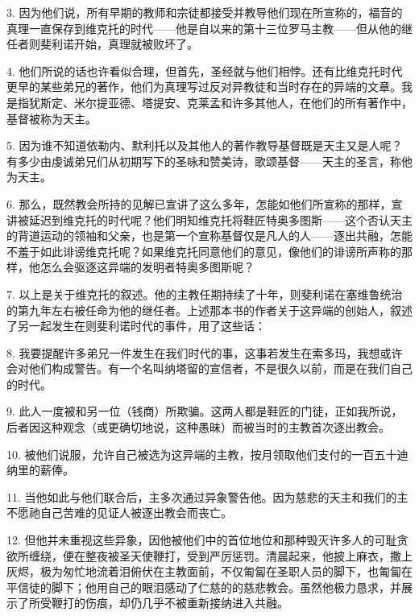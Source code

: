 3. 因为他们说，所有早期的教师和宗徒都接受并教导他们现在所宣称的，福音的真理一直保存到维克托的时代——他是自以来的第十三位罗马主教——但从他的继任者则斐利诺开始，真理就被败坏了。\par

4. 他们所说的话也许看似合理，但首先，圣经就与他们相悖。还有比维克托时代更早的某些弟兄的著作，他们为真理写过反对异教徒和当时存在的异端的文章。我是指犹斯定、米尔提亚德、塔提安、克莱孟和许多其他人，在他们的所有著作中，基督被称为天主。\par

5. 因为谁不知道依勒内、默利托以及其他人的著作教导基督既是天主又是人呢？有多少由虔诚弟兄们从初期写下的圣咏和赞美诗，歌颂基督——天主的圣言，称他为天主。\par

6. 那么，既然教会所持的见解已宣讲了这么多年，怎能如他们所宣称的那样，宣讲被延迟到维克托的时代呢？他们明知维克托将鞋匠特奥多图斯——这个否认天主的背道运动的领袖和父亲，也是第一个宣称基督仅是凡人的人——逐出共融，怎能不羞于如此诽谤维克托呢？如果维克托同意他们的意见，像他们的诽谤所声称的那样，他怎么会驱逐这异端的发明者特奥多图斯呢？\par

7. 以上是关于维克托的叙述。他的主教任期持续了十年，则斐利诺在塞维鲁统治的第九年左右被任命为他的继任者。上述那本书的作者关于这异端的创始人，叙述了另一起发生在则斐利诺时代的事件，用了这些话：\par

8. 我要提醒许多弟兄一件发生在我们时代的事，这事若发生在索多玛，我想或许会对他们构成警告。有一个名叫纳塔留的宣信者，不是很久以前，而是在我们自己的时代。\par

9. 此人一度被和另一位（钱商）所欺骗。这两人都是鞋匠的门徒，正如我所说，后者因这种观念（或更确切地说，这种愚昧）而被当时的主教首次逐出教会。\par

10. 被他们说服，允许自己被选为这异端的主教，按月领取他们支付的一百五十迪纳里的薪俸。\par

11. 当他如此与他们联合后，主多次通过异象警告他。因为慈悲的天主和我们的主不愿祂自己苦难的见证人被逐出教会而丧亡。\par

12. 但他并未重视这些异象，因他被他们中的首位地位和那种毁灭许多人的可耻贪欲所缠绕，便在整夜被圣天使鞭打，受到严厉惩罚。清晨起来，他披上麻衣，撒上灰烬，极为匆忙地流着泪俯伏在主教面前，不仅匍匐在圣职人员的脚下，也匍匐在平信徒的脚下；他用自己的眼泪感动了仁慈的的慈悲教会。虽然他极力恳求，并展示了所受鞭打的伤痕，却仍几乎不被重新接纳进入共融。\par

